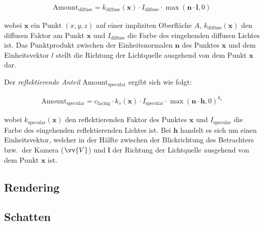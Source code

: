 \begin{gather}
    \text{Amount}_{\text{diffuse}} = k_{\text{diffuse}}(\bm{x}) \cdot
                              I_{\text{diffuse}} \cdot \max(\bm{n} \cdot
                              \bm{l}, 0)
\end{gather}

wobei $\bm{x}$ ein Punkt $(x, y, z)$ auf einer impliziten Oberfläche $A$,
$k_{\text{diffuse}}(\bm{x})$ den diffusen Faktor am Punkt $\bm{x}$ und
$I_{\text{diffuse}}$ die Farbe des eingehenden diffusen Lichtes ist. Das
Punktprodukt zwischen der Einheitsnormalen $\bm{n}$ des Punktes $\bm{x}$ und
dem Einheitsvektor $l$ stellt die Richtung der Lichtquelle ausgehend von dem
Punkt $\bm{x}$ dar.

Der \textit{reflektierende Anteil} $\text{Amount}_{\text{specular}}$ ergibt sich
wie folgt:

\begin{gather}
    \text{Amount}_{\text{specular}} = c_{\text{facing}} \cdot k_{s}(\bm{x}) \cdot I_{\text{specular}} \cdot \max{(\bm{n} \cdot \bm{h}, 0)}^{k_{e}}
\end{gather}

wobei $k_{\text{specular}}(\bm{x})$ den reflektierenden Faktor des Punktes
$\bm{x}$ und $I_{\text{specular}}$ die Farbe des eingehenden reflektierenden
Lichtes ist. Bei $\bm{h}$ handelt es sich um einen Einheitsvektor, welcher in
der Hälfte zwischen der Blickrichtung des Betrachters bzw.\ der Kamera
($\vv{V}$) und $\bm{l}$ der Richtung der Lichtquelle ausgehend von dem Punkt
$\bm{x}$ ist.

\subsection{Rendering}
\label{sec:rendering_implicit_surfaces_Rendering}

\subsection{Schatten}
\label{sec:rendering_implicit_surfaces_shadows}
